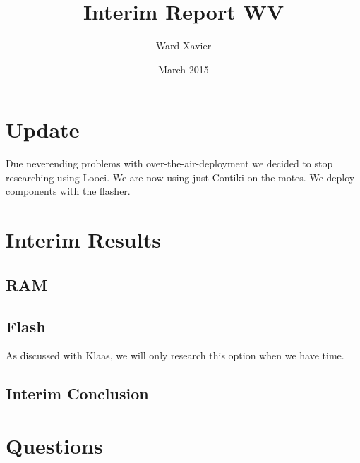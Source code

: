 \documentclass{article}
\title{Interim Report WV}
\author{Ward  Xavier}
\date{March 2015}
\begin{document}
\maketitle

\section{Update}
Due neverending problems with over-the-air-deployment we decided to stop researching using Looci. We are now using just Contiki on the motes. We deploy components with the flasher.
\section{Interim Results}
\subsection{RAM}

\subsection{Flash}
As discussed with Klaas, we will only research this option when we have time.

\subsection{Interim Conclusion}
\section{Questions}
\end{document}
